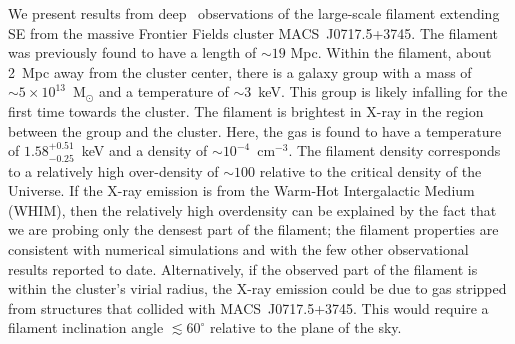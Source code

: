 We present results from deep \chandra\ observations of the large-scale filament extending SE from the massive Frontier Fields cluster MACS~J0717.5+3745. The filament was previously found to have a length of $\sim 19$ Mpc. Within the filament, about 2~Mpc away from the cluster center, there is a galaxy group with a mass of $\sim 5\times 10^{13}$~M$_\odot$ and a temperature of $\sim 3$~keV. This group is likely infalling for the first time towards the cluster. The filament is brightest in X-ray in the region between the group and the cluster. Here, the gas is found to have a temperature of $1.58_{-0.25}^{+0.51}$~keV and a density of $\sim 10^{-4}$~cm$^{-3}$. The filament density corresponds to a relatively high over-density of $\sim 100$ relative to the critical density of the Universe. If the X-ray emission is from the Warm-Hot Intergalactic Medium (WHIM), then the relatively high overdensity can be explained by the fact that we are probing only the densest part of the filament; the filament properties are consistent with numerical simulations and with the few other observational results reported to date. Alternatively, if the observed part of the filament is within the cluster's virial radius, the X-ray emission could be due to gas stripped from structures that collided with MACS~J0717.5+3745. This would require a filament inclination angle $\lesssim 60^\circ$ relative to the plane of the sky.